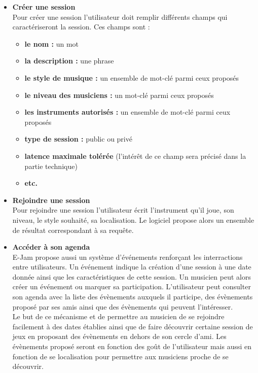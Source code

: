 \documentclass[a4,12pt]{article}
\begin{document}
\begin{itemize}
    \item \textbf{Créer une session} \\
    Pour créer une session l'utilisateur doit remplir différents champs qui caractériseront la session. Ces champs sont :
    \begin{itemize}
        \item \textbf{le nom :} un mot
        \item \textbf{la description :} une phrase
        \item \textbf{le style de musique :} un ensemble de mot-clé parmi ceux proposés
        \item \textbf{le niveau des musiciens :} un mot-clé parmi ceux proposés
        \item \textbf{les instruments autorisés :} un ensemble de mot-clé parmi ceux proposés
        \item \textbf{type de session :} public ou privé
        \item \textbf{latence maximale tolérée } (l'intérêt de ce champ sera précisé dans la partie technique)
        \item \textbf{etc.}
    \end{itemize}
    \item \textbf{Rejoindre une session}\\
    Pour rejoindre une session l’utilisateur écrit l’instrument qu’il joue, son niveau, le style souhaité, sa localisation. Le logiciel propose alors un ensemble de résultat correspondant à sa requête.
    \item \textbf{Accéder à son agenda}\\
    E-Jam propose aussi un système d’événements renforçant les interractions entre utilisateurs. Un événement indique la création d’une session à une date donnée ainsi que les caractéristiques de cette session. Un musicien peut alors créer un événement ou marquer sa participation. L’utilisateur peut consulter son agenda avec la liste des évènements auxquels il participe, des évènements proposé par ses amis ainsi que des évènements qui peuvent l'intéresser.\\
    Le but de ce mécanisme et de permettre au musicien de se rejoindre facilement à des dates établies ainsi que de faire découvrir certaine session de jeux en proposant des évènements en dehors de son cercle d’ami. Les évènements proposé seront en fonction des goût de l’utilisateur mais aussi en fonction de se localisation pour permettre aux musiciens proche de se découvrir.\\

\end{itemize}
\end{document}
